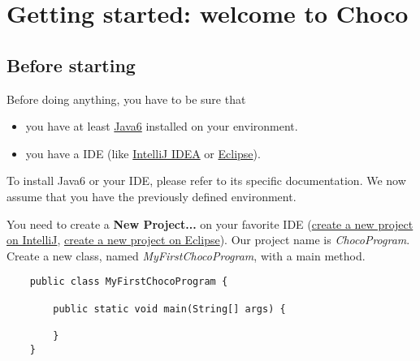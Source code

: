 \label{gettingstarted}
\hypertarget{gettingstarted}{}

\chapter{Getting started: welcome to Choco}\label{gettingstarted:gettingstarted:welcometochoco}\hypertarget{gettingstarted:gettingstarted:welcometochoco}{}


\section{Before starting}\label{gettingstarted:beforestarting}\hypertarget{gettingstarted:beforestarting}{}

Before doing anything, you have to be sure that 
\begin{itemize}
	\item you have at least \href{http://java.sun.com/javase/6/}{Java6} installed on your environment.
	\item you have a IDE (like \href{http://www.jetbrains.com/idea/}{IntelliJ IDEA} or \href{http://www.eclipse.org/}{Eclipse}).
\end{itemize}

To install Java6 or your IDE, please refer to its specific documentation. We now assume that you have the previously defined environment.

You need to create a \textbf{New Project...} on your favorite IDE (\href{http://www.jetbrains.com/idea/training/demos.html}{create a new project on IntelliJ}, \href{https://eclipse-tutorial.dev.java.net/eclipse-tutorial/part1.html}{create a new project on Eclipse}). Our project name is \emph{ChocoProgram}.
Create a new class, named \emph{MyFirstChocoProgram}, with a main method.
\begin{lstlisting}
	public class MyFirstChocoProgram {
	
	    public static void main(String[] args) {
	        
	    }
	}
\end{lstlisting}

